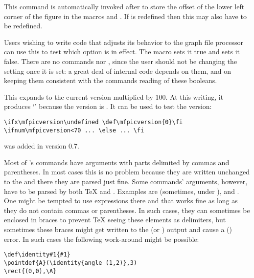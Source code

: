 \documentclass[letterpaper]{article}
\begin{document}
\begin{cd}
%
\end{cd}

This command is automatically invoked after  to
store the offset of the lower left corner of the figure in the macros
 and . If  is redefined
then this may also have to be redefined.

\begin{cd}
%
\end{cd}

Users wishing to write code that adjusts its behavior to the graph file
processor can use this to test which option is in effect. The macro
 sets it true and  sets it false. There
are no commands  nor , since the user
should not be changing the setting once it is set: a great deal of
\mfp{} internal code depends on them, and on keeping them consistent
with the  commands reading of these booleans.

\begin{cd}
%
\end{cd}

This expands to the current \mfp{} version multiplied by 100. At this
writing, it produces `\texttt{\mfpicversion}' because the version is
\mfpversion. It can be used to test the version:
\begin{verbatim}
\ifx\mfpicversion\undefined \def\mfpicversion{0}\fi
\ifnum\mfpicversion<70 ... \else ... \fi
\end{verbatim}
 was added in version 0.7.


Most of \mfp{}'s commands have arguments with parts delimited by commas
and parentheses. In most cases this is no problem because they are
written unchanged to the  and there they are parsed just fine.
Some commands' arguments, however, have to be parsed by both \TeX{} and
\MF{}. Examples are  (sometimes, under ), and
. One might be tempted to use \MP{} expressions there and
that works fine as long as they do not contain commas or parentheses. In
such cases, they can sometimes be enclosed in braces to prevent \TeX{}
seeing these elements as delimiters, but sometimes these braces might
get written to the  (or ) output and cause a \MF{}
(\MP{}) error. In such cases the following work-around might be possible:
\begin{verbatim}
\def\identity#1{#1}
\pointdef{A}(\identity{angle (1,2)},3)
\rect{(0,0),\A}
\end{verbatim}
\end{document}
